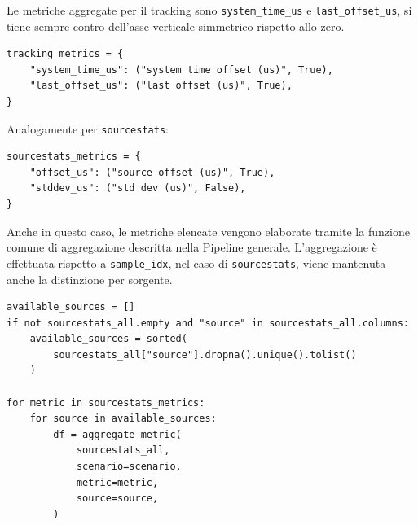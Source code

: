 Le metriche aggregate per il tracking sono \texttt{system\_time\_us} e
\texttt{last\_offset\_us}, si tiene sempre contro dell'asse verticale 
simmetrico rispetto allo zero.

\begin{listing}[H]
\begin{verbatim}
tracking_metrics = {
    "system_time_us": ("system time offset (us)", True),
    "last_offset_us": ("last offset (us)", True),
}
\end{verbatim}
\caption{Metriche di tracking aggregate nello script Chrony.}
\label{lst:chrony-tracking-metrics}
\end{listing}

Analogamente per \texttt{sourcestats}:

\begin{listing}[H]
\begin{verbatim}
sourcestats_metrics = {
    "offset_us": ("source offset (us)", True),
    "stddev_us": ("std dev (us)", False),
}
\end{verbatim}
\caption{Metriche \texttt{sourcestats} aggregate nello script Chrony.}
\label{lst:chrony-sourcestats-metrics}
\end{listing}

Anche in questo caso, le metriche elencate vengono elaborate tramite la funzione
comune di aggregazione descritta nella Pipeline generale. L'aggregazione è
effettuata rispetto a \texttt{sample\_idx}, nel caso di
\texttt{sourcestats}, viene mantenuta anche la distinzione per sorgente.

\begin{listing}[H]
\begin{verbatim}
available_sources = []
if not sourcestats_all.empty and "source" in sourcestats_all.columns:
    available_sources = sorted(
        sourcestats_all["source"].dropna().unique().tolist()
    )

for metric in sourcestats_metrics:
    for source in available_sources:
        df = aggregate_metric(
            sourcestats_all,
            scenario=scenario,
            metric=metric,
            source=source,
        )
\end{verbatim}
\caption{Aggregazione delle metriche Chrony per sorgente.}
\label{lst:chrony-source-aggregation}
\end{listing}

